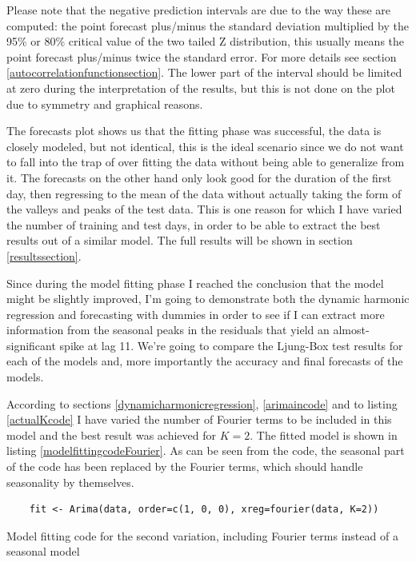 \documentclass[12pt,a4paper,titlepage]{report}
\begin{document}
Please note that the negative prediction intervals are due to the way these are computed: the point forecast plus/minus the standard deviation multiplied by the 95\% or 80\% critical value of the two tailed Z distribution, this usually means the point forecast plus/minus twice the standard error. For more details see section \ref{autocorrelationfunctionsection}. The lower part of the interval should be limited at zero during the
interpretation of the results, but this is not done on the plot due to symmetry and graphical reasons.

The forecasts plot shows us that the fitting phase was successful, the data is closely modeled, but not identical, this is the ideal scenario since we do not want to fall into the trap of over fitting the data without being able to generalize from it. The forecasts on the other hand only look good for the duration of the first day, then regressing to the mean of the data without actually taking the form of the valleys and peaks of the test data. This is one reason for which I have varied the number of training and test days, in order to be able to extract the best results out of a similar model. The full results will be shown in section \ref{resultssection}.

Since during the model fitting phase I reached the conclusion that the model might be slightly improved, I'm going to demonstrate both the dynamic harmonic regression and forecasting with dummies in order to see if I can extract more information from the seasonal peaks in the residuals that yield an almost-significant spike at lag 11. We're going to compare the Ljung-Box test results for each of the models and, more importantly the accuracy and final forecasts of the models.

According to sections \ref{dynamicharmonicregression}, \ref{arimaincode} and to listing \ref{actualKcode} I have varied the number of Fourier terms to be included in this model and the best result was achieved for $ K = 2 $. The fitted model is shown in listing \ref{modelfittingcodeFourier}. As can be seen from the code, the seasonal part of the code has been replaced by the Fourier terms, which should handle seasonality by themselves.

\begin{listing}[h]
    \begin{verbatim}
    fit <- Arima(data, order=c(1, 0, 0), xreg=fourier(data, K=2))
    \end{verbatim}
    
    \caption{Model fitting code for the second variation, including Fourier terms instead of a seasonal model}
    \label{modelfittingcodeFourier}
\end{listing}
\end{document}
